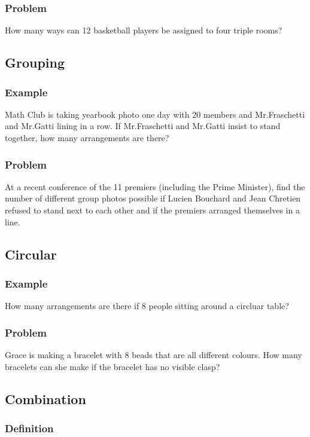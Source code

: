 \documentclass{article}
\begin{document}
\subsubsection{Problem}
How many ways can 12 basketball players be assigned to four triple rooms?
\pagebreak

\subsection{Grouping}
\subsubsection{Example}
Math Club is taking yearbook photo one day with 20 members and Mr.Fraschetti and Mr.Gatti lining in a row. If Mr.Fraschetti and Mr.Gatti insist to stand together, how many arrangements are there?
\vspace{20px}
\subsubsection{Problem}
At a recent conference of the 11 premiers (including the Prime Minister), find the number of different group photos possible if Lucien Bouchard and Jean Chretien
refused to stand next to each other and if the premiers arranged themselves in a line.
\vspace{20px}
\subsection{Circular}
\subsubsection{Example}
How many arrangements are there if 8 people sitting around a circluar table?
\vspace{20px}
\subsubsection{Problem}
Grace is making a bracelet with 8 beads that are all different colours. How many bracelets can she make if the bracelet has no visible clasp?
\vspace{20px}
\subsection{Combination}
\subsubsection{Definition}
\vspace{20px}
\end{document}

